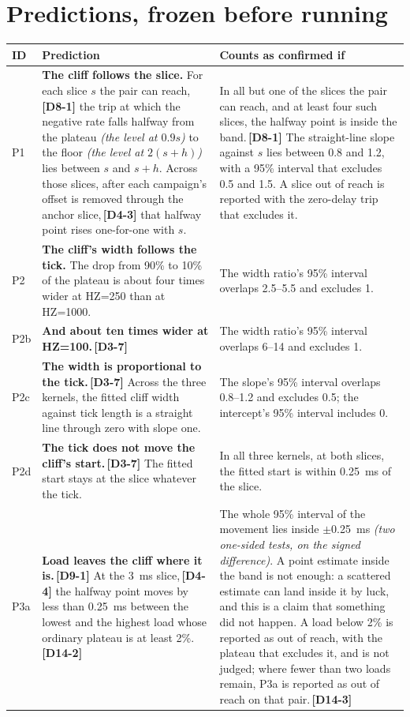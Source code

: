 \documentclass[11pt]{article}
\newcommand{\gl}[1]{{\color{soft}\itshape\small (#1)}}
\newcommand{\chgold}[1]{\,{\color{oldcol}\bfseries\footnotesize[#1]}}
\begin{document}
\section{Predictions, frozen before running}\label{sec:predictions}
{\small
\begin{longtable}{@{}p{1.0cm} p{9.5cm} p{5.6cm}@{}}
\toprule
\textbf{ID} & \textbf{Prediction} & \textbf{Counts as confirmed if} \\
\midrule
\endhead
P1 & \textbf{The cliff follows the slice.} For each slice $s$ the pair can reach,\chgold{D8-1} the trip at which the negative rate falls halfway from the plateau \gl{the level at $0.9s$} to the floor \gl{the level at $2(s+h)$} lies between $s$ and $s + h$. Across those slices, after each campaign's offset is removed through the anchor slice,\chgold{D4-3} that halfway point rises one-for-one with $s$. & In all but one of the slices the pair can reach, and at least four such slices, the halfway point is inside the band.\chgold{D8-1} The straight-line slope against $s$ lies between 0.8 and 1.2, with a 95\% interval that excludes 0.5 and 1.5. A slice out of reach is reported with the zero-delay trip that excludes it. \\
P2 & \textbf{The cliff's width follows the tick.} The drop from 90\% to 10\% of the plateau is about four times wider at HZ=250 than at HZ=1000. & The width ratio's 95\% interval overlaps 2.5--5.5 and excludes 1. \\
P2b & \textbf{And about ten times wider at HZ=100.}\chgold{D3-7} & The width ratio's 95\% interval overlaps 6--14 and excludes 1. \\
P2c & \textbf{The width is proportional to the tick.}\chgold{D3-7} Across the three kernels, the fitted cliff width against tick length is a straight line through zero with slope one. & The slope's 95\% interval overlaps 0.8--1.2 and excludes 0.5; the intercept's 95\% interval includes 0. \\
P2d & \textbf{The tick does not move the cliff's start.}\chgold{D3-7} The fitted start stays at the slice whatever the tick. & In all three kernels, at both slices, the fitted start is within 0.25~ms of the slice. \\
P3a & \textbf{Load leaves the cliff where it is.}\chgold{D9-1} At the 3~ms slice,\chgold{D4-4} the halfway point moves by less than 0.25~ms between the lowest and the highest load whose ordinary plateau is at least 2\%.\chgold{D14-2} & The whole 95\% interval of the movement lies inside $\pm$0.25~ms \gl{two one-sided tests, on the signed difference}. A point estimate inside the band is not enough: a scattered estimate can land inside it by luck, and this is a claim that something did not happen. A load below 2\% is reported as out of reach, with the plateau that excludes it, and is not judged; where fewer than two loads remain, P3a is reported as out of reach on that pair.\chgold{D14-3} \\

\end{longtable}}
\end{document}

